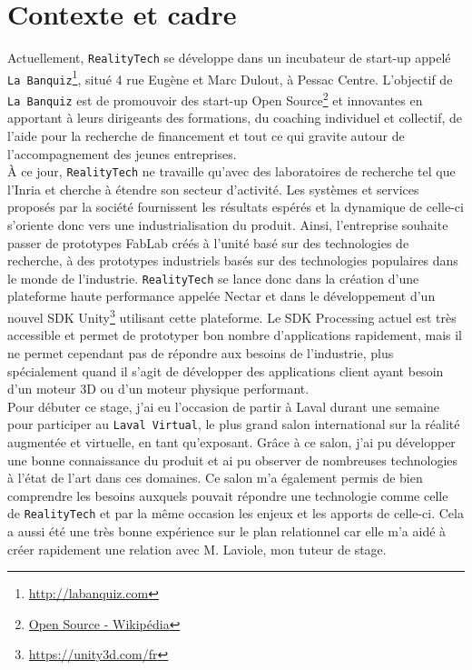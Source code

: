 \section{Contexte et cadre}
\label{sec:contexte}
Actuellement, \texttt{RealityTech} se développe dans un incubateur de start-up appelé \texttt{La Banquiz}\footnote{\href{http://labanquiz.com}{http://labanquiz.com}}, situé 4 rue Eugène et Marc Dulout, à Pessac Centre. L'objectif de \texttt{La Banquiz} est de promouvoir des start-up Open Source\footnote{\href{https://fr.wikipedia.org/wiki/Open\_source}{Open Source - Wikipédia}} et innovantes en apportant à leurs dirigeants des formations, du coaching individuel et collectif, de l'aide pour la recherche de financement et tout ce qui gravite autour de l'accompagnement des jeunes entreprises.\\

À ce jour, \texttt{RealityTech} ne travaille qu'avec des laboratoires de recherche tel que l'Inria et cherche à étendre son secteur d'activité. Les systèmes et services proposés par la société fournissent les résultats espérés et la dynamique de celle-ci s'oriente donc vers une industrialisation du produit. Ainsi, l'entreprise souhaite passer de prototypes FabLab créés à l'unité basé sur des technologies de recherche, à des prototypes industriels basés sur des technologies populaires dans le monde de l'industrie. \texttt{RealityTech} se lance donc dans la création d'une plateforme haute performance appelée Nectar et dans le développement d'un nouvel SDK Unity\footnote{\href{https://unity3d.com/fr}{https://unity3d.com/fr}} utilisant cette plateforme. Le SDK Processing actuel est très accessible et permet de prototyper bon nombre d'applications rapidement, mais il ne permet cependant pas de répondre aux besoins de l'industrie, plus spécialement quand il s'agit de développer des applications client ayant besoin d'un moteur 3D ou d'un moteur physique performant.\\

Pour débuter ce stage, j'ai eu l'occasion de partir à Laval durant une semaine pour participer au \texttt{Laval Virtual}, le plus grand salon international sur la réalité augmentée et virtuelle, en tant qu'exposant. Grâce à ce salon, j'ai pu développer une bonne connaissance du produit et ai pu observer de nombreuses technologies à l'état de l'art dans ces domaines. Ce salon m'a également permis de bien comprendre les besoins auxquels pouvait répondre une technologie comme celle de \texttt{RealityTech} et par la même occasion les enjeux et les apports de celle-ci. Cela a aussi été une très bonne expérience sur le plan relationnel car elle m'a aidé à créer rapidement une relation avec M. Laviole, mon tuteur de stage.


